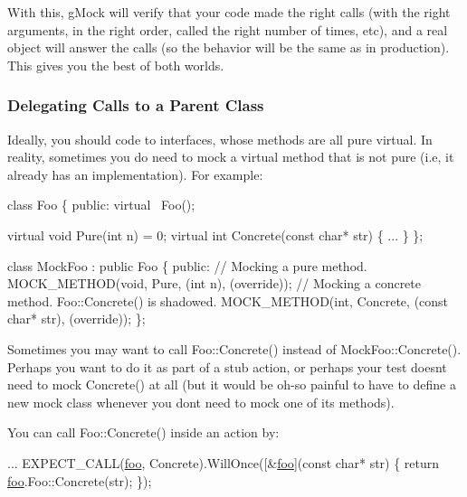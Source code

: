 With this, g\+Mock will verify that your code made the right calls (with the right arguments, in the right order, called the right number of times, etc), and a real object will answer the calls (so the behavior will be the same as in production). This gives you the best of both worlds.

\subsubsection*{Delegating Calls to a Parent Class}

Ideally, you should code to interfaces, whose methods are all pure virtual. In reality, sometimes you do need to mock a virtual method that is not pure (i.\+e, it already has an implementation). For example\+:


\begin{DoxyCode}
\textcolor{keyword}{class }Foo \{
 \textcolor{keyword}{public}:
  \textcolor{keyword}{virtual} ~Foo();

  \textcolor{keyword}{virtual} \textcolor{keywordtype}{void} Pure(\textcolor{keywordtype}{int} n) = 0;
  \textcolor{keyword}{virtual} \textcolor{keywordtype}{int} Concrete(\textcolor{keyword}{const} \textcolor{keywordtype}{char}* str) \{ ... \}
\};

\textcolor{keyword}{class }MockFoo : \textcolor{keyword}{public} Foo \{
 \textcolor{keyword}{public}:
  \textcolor{comment}{// Mocking a pure method.}
  MOCK\_METHOD(\textcolor{keywordtype}{void}, Pure, (\textcolor{keywordtype}{int} n), (\textcolor{keyword}{override}));
  \textcolor{comment}{// Mocking a concrete method.  Foo::Concrete() is shadowed.}
  MOCK\_METHOD(\textcolor{keywordtype}{int}, Concrete, (\textcolor{keyword}{const} \textcolor{keywordtype}{char}* str), (\textcolor{keyword}{override}));
\};
\end{DoxyCode}


Sometimes you may want to call {\ttfamily Foo\+::\+Concrete()} instead of {\ttfamily Mock\+Foo\+::\+Concrete()}. Perhaps you want to do it as part of a stub action, or perhaps your test doesn\textquotesingle{}t need to mock {\ttfamily Concrete()} at all (but it would be oh-\/so painful to have to define a new mock class whenever you don\textquotesingle{}t need to mock one of its methods).

You can call {\ttfamily Foo\+::\+Concrete()} inside an action by\+:


\begin{DoxyCode}
...
  EXPECT\_CALL(\mbox{\hyperlink{namespacefoo}{foo}}, Concrete).WillOnce([&\mbox{\hyperlink{namespacefoo}{foo}}](\textcolor{keyword}{const} \textcolor{keywordtype}{char}* str) \{
    \textcolor{keywordflow}{return} \mbox{\hyperlink{namespacefoo}{foo}}.Foo::Concrete(str);
  \});
\end{DoxyCode}


